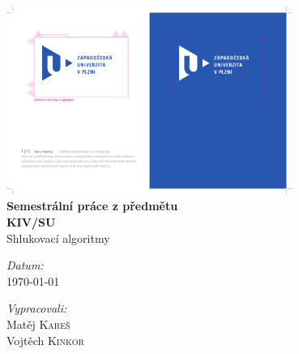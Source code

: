 \begin{titlepage}
\begin{center}


~\\[2.5cm]
\includegraphics[width=0.7\textwidth]{res/logo}
\\[0.5cm]


{ \huge \bf Semestrální práce z předmětu\\ KIV/SU \\[0.6cm] }
{ \LARGE \sc Shlukovací algoritmy }

\vfill

\begin{minipage}{0.45\textwidth}
\begin{flushleft} 
\emph{Datum:}\\
\today
\end{flushleft}
\end{minipage}

\begin{minipage}{0.45\textwidth}
\begin{flushright} 
\emph{Vypracovali:} \\
Matěj \textsc{Kareš}\\
Vojtěch \textsc{Kinkor}
\end{flushright}
\end{minipage}



\end{center}
\end{titlepage}